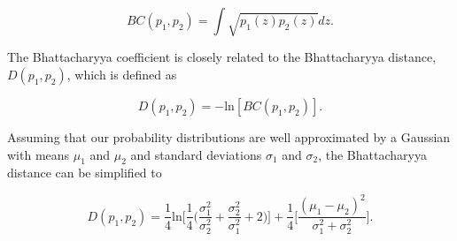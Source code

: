 \begin{equation}
    BC(p_1, p_2) = \int \sqrt{p_1(z) p_2(z)} dz.
\end{equation}

The Bhattacharyya coefficient is closely related to the Bhattacharyya distance, $D(p_1,p_2)$, which is defined as

\begin{equation}
    D(p_1, p_2) = -\textrm{ln}[BC(p_1, p_2)].
\label{eq:Bhattacharyya_distance}
\end{equation}

Assuming that our probability distributions are well approximated by a Gaussian with means $\mu_1$ and $\mu_2$ and standard deviations $\sigma_1$ and $\sigma_2$, the Bhattacharyya distance can be simplified to

\begin{equation}
    D(p_1, p_2) = \frac{1}{4}\textrm{ln}\Bigg[\frac{1}{4}\Bigg(\frac{\sigma_1^2}{\sigma_2^2}+\frac{\sigma_2^2}{\sigma_1^2}+2\Bigg)\Bigg] + \frac{1}{4}\Bigg[\frac{(\mu_1 - \mu_2)^2}{\sigma_1^2 + \sigma_2^2}\Bigg].
\label{eq:Bhattacharyya_distance_gaussian}
\end{equation}

